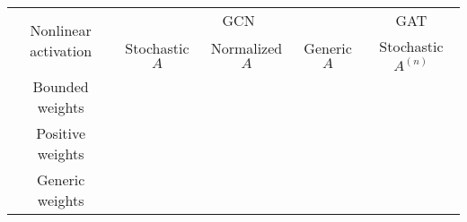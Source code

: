 \begin{tabular}{c|c c c|c}
        \toprule
        \multirow{2}{*}{Nonlinear activation} & \multicolumn{3}{c|}{GCN} & \multicolumn{1}{c}{GAT} \\
        \cmidrule(lr){2-4} \cmidrule(lr){5-5}
        & Stochastic $A$ & Normalized $A$ & Generic $A$ & Stochastic $A^{(n)}$ \\ 
        \midrule
        Bounded weights & & & & \\
        Positive weights & & & & \\
        Generic weights & & & & \\
        \bottomrule
    \end{tabular}
